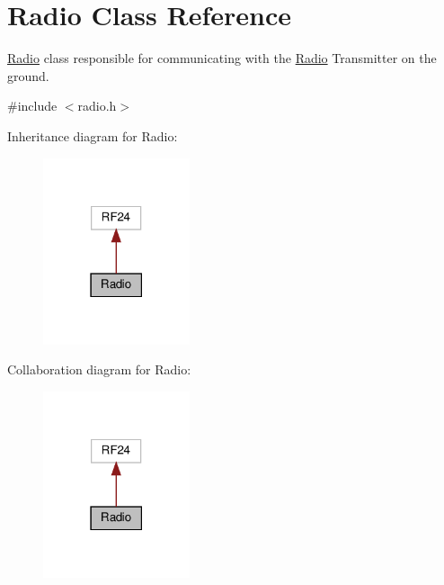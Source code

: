 \hypertarget{class_radio}{}\section{Radio Class Reference}
\label{class_radio}


\hyperlink{class_radio}{Radio} class responsible for communicating with the \hyperlink{class_radio}{Radio} Transmitter on the ground.  




{\ttfamily \#include $<$radio.\+h$>$}



Inheritance diagram for Radio\+:\nopagebreak
\begin{figure}[H]
\begin{center}
\leavevmode
\includegraphics[width=122pt]{class_radio__inherit__graph}
\end{center}
\end{figure}


Collaboration diagram for Radio\+:\nopagebreak
\begin{figure}[H]
\begin{center}
\leavevmode
\includegraphics[width=122pt]{class_radio__coll__graph}
\end{center}
\end{figure}
